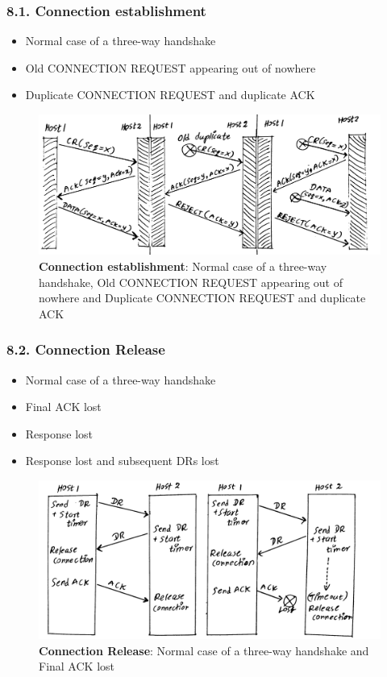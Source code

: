 \documentclass[a4paper,11pt]{article}
\begin{document}
\subsubsection*{8.1. Connection establishment}

\begin{itemize}
\item Normal case of a three-way handshake
\item Old CONNECTION REQUEST appearing out of nowhere
\item Duplicate CONNECTION REQUEST  and duplicate ACK
\end{itemize}

\begin{figure}[H]
	\centering
	\includegraphics[scale=0.14]{figures/img100}
	\caption{\textbf{Connection establishment}: Normal case of a three-way handshake, Old CONNECTION REQUEST appearing out of nowhere and Duplicate CONNECTION REQUEST  and duplicate ACK}
\end{figure}

\subsubsection*{8.2. Connection Release}

\begin{itemize}
\item Normal case of a three-way handshake
\item Final ACK lost
\item Response lost
\item Response lost and subsequent DRs lost
\end{itemize}

\begin{figure}[H]
	\centering
	\includegraphics[scale=0.14]{figures/img101}
	\caption{\textbf{Connection Release}: Normal case of a three-way handshake and Final ACK lost}
\end{figure}
\end{document}
